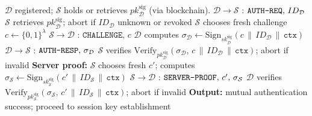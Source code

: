 \begin{algorithm}[!t]
\caption{Authentication Phase (Mutual)}
\label{alg:authentication}
\begin{algorithmic}[1]
\Require $\mathcal{D}$ registered; $\mathcal{S}$ holds or retrieves $pk_{\mathcal{D}}^{\mathrm{sig}}$ (via blockchain).
\State $\mathcal{D} \rightarrow \mathcal{S}$ : $\texttt{AUTH\text{-}REQ},\, ID_{\mathcal{D}}$
\State $\mathcal{S}$ retrieves $pk_{\mathcal{D}}^{\mathrm{sig}}$; abort if $ID_{\mathcal{D}}$ unknown or revoked
\State $\mathcal{S}$ chooses fresh challenge $c \gets \{0,1\}^{\lambda}$
\State $\mathcal{S} \rightarrow \mathcal{D}$ : $\texttt{CHALLENGE},\, c$
\State $\mathcal{D}$ computes $\sigma_{\mathcal{D}} \gets \mathrm{Sign}_{sk_{\mathcal{D}}^{\mathrm{sig}}}(c \,\|\, ID_{\mathcal{D}} \,\|\, \texttt{ctx})$
\State $\mathcal{D} \rightarrow \mathcal{S}$ : $\texttt{AUTH\text{-}RESP},\, \sigma_{\mathcal{D}}$
\State $\mathcal{S}$ verifies $\mathrm{Verify}_{pk_{\mathcal{D}}^{\mathrm{sig}}}(\sigma_{\mathcal{D}},\, c \,\|\, ID_{\mathcal{D}} \,\|\, \texttt{ctx})$; abort if invalid
\State \textbf{Server proof:} $\mathcal{S}$ chooses fresh $c'$; computes $\sigma_{\mathcal{S}} \gets \mathrm{Sign}_{sk_{\mathcal{S}}^{\mathrm{sig}}}(c' \,\|\, ID_{\mathcal{S}} \,\|\, \texttt{ctx})$
\State $\mathcal{S} \rightarrow \mathcal{D}$ : $\texttt{SERVER\text{-}PROOF},\, c',\, \sigma_{\mathcal{S}}$
\State $\mathcal{D}$ verifies $\mathrm{Verify}_{pk_{\mathcal{S}}^{\mathrm{sig}}}(\sigma_{\mathcal{S}},\, c' \,\|\, ID_{\mathcal{S}} \,\|\, \texttt{ctx})$; abort if invalid
\State \textbf{Output:} mutual authentication success; proceed to session key establishment
\end{algorithmic}
\end{algorithm}
